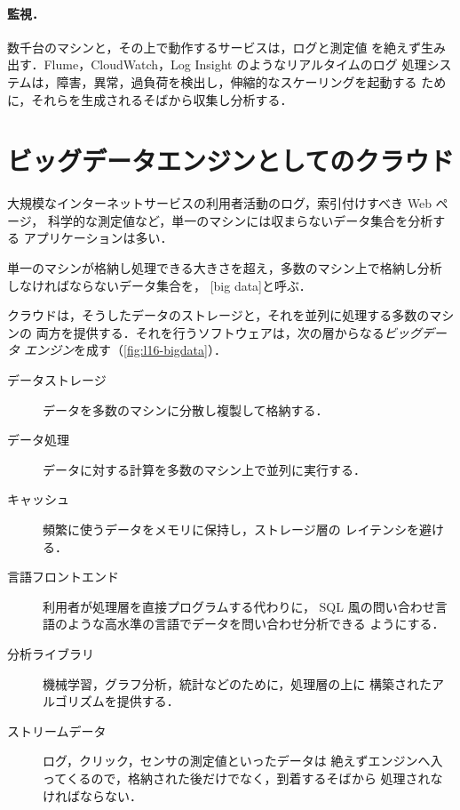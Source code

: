 \documentclass[../main.tex]{subfiles}
\begin{document}
\paragraph{監視．}数千台のマシンと，その上で動作するサービスは，ログと測定値
を絶えず生み出す．Flume，CloudWatch，Log Insight のようなリアルタイムのログ
処理システムは，障害，異常，過負荷を検出し，伸縮的なスケーリングを起動する
ために，それらを生成されるそばから収集し分析する．

\section{ビッグデータエンジンとしてのクラウド}
\label{sec:l16-bigdata}

大規模なインターネットサービスの利用者活動のログ，索引付けすべき Web ページ，
科学的な測定値など，単一のマシンには収まらないデータ集合を分析する
アプリケーションは多い．

\begin{definition}[ビッグデータ]
  単一のマシンが格納し処理できる大きさを超え，多数のマシン上で格納し分析
  しなければならないデータ集合を，%
  [big data]と呼ぶ．
\end{definition}

クラウドは，そうしたデータのストレージと，それを並列に処理する多数のマシンの
両方を提供する．それを行うソフトウェアは，次の層からなる\emph{ビッグデータ
エンジン}を成す（\cref{fig:l16-bigdata}）．
\begin{description}
  \item[データストレージ] データを多数のマシンに分散し複製して格納する．
  \item[データ処理] データに対する計算を多数のマシン上で並列に実行する．
  \item[キャッシュ] 頻繁に使うデータをメモリに保持し，ストレージ層の
    レイテンシを避ける．
  \item[言語フロントエンド] 利用者が処理層を直接プログラムする代わりに，
    SQL 風の問い合わせ言語のような高水準の言語でデータを問い合わせ分析できる
    ようにする．
  \item[分析ライブラリ] 機械学習，グラフ分析，統計などのために，処理層の上に
    構築されたアルゴリズムを提供する．
  \item[ストリームデータ] ログ，クリック，センサの測定値といったデータは
    絶えずエンジンへ入ってくるので，格納された後だけでなく，到着するそばから
    処理されなければならない．
\end{description}
\end{document}
